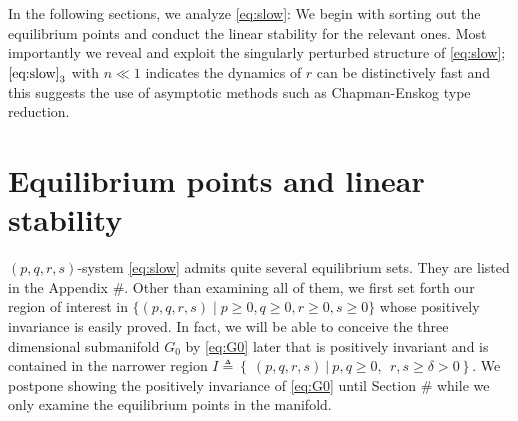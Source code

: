 \documentclass[a4paper,11pt]{article}
\def\blue{\color{blue}}
\begin{document}
{\blue
In the following sections, we analyze \eqref{eq:slow}: We begin with sorting out the equilibrium points and conduct the linear stability for the relevant ones. Most importantly we reveal and exploit the singularly perturbed structure of \eqref{eq:slow}; $\eqref{eq:slow}_3$ with $n\ll1$ indicates the dynamics of $r$ can be distinctively fast and this suggests the use of asymptotic methods such as Chapman-Enskog type reduction.
}
\section{Equilibrium points and linear stability} \label{sec:equil}
$(p,q,r,s)$-system \eqref{eq:slow} admits quite several equilibrium sets. They are listed in the Appendix \#. Other than examining all of them, we first set forth our region of interest in $\{(p,q,r,s) \; | \; p\ge0, q\ge0, r\ge0, s\ge0 \}$ whose positively invariance is easily proved. In fact, we will be able to conceive the three dimensional submanifold $G_0$ by \eqref{eq:G0} later that is positively invariant and is contained in
the narrower region $I \triangleq\left\{ \: (p,q,r,s) \: | \:  p,q\ge0, ~~ r,s\ge\delta>0\right\}$.
We postpone showing the positively invariance of \eqref{eq:G0} until  Section \# while we only examine the equilibrium points in the manifold.
\end{document}
